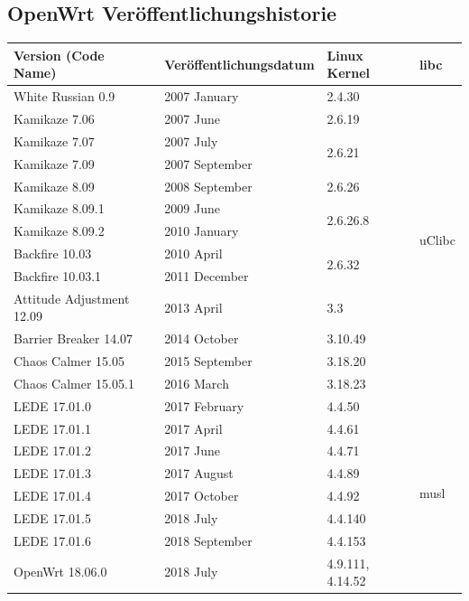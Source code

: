 \documentclass[a4paper]{book}
\begin{document}
\begin{large}
\begin{appendix}
\chapter{OpenWrt Veröffentlichungshistorie}
\begin{table}[ht]
\centering
\def\arraystretch{1}
\begin{tabular}{llll}
\hline
\textbf{Version (Code Name)} & \textbf{Veröffentlichungsdatum} & \textbf{Linux Kernel} & \textbf{libc} \\ \hline
White Russian 0.9 & 2007 January & 2.4.30 & \multirow{13}{*}{uClibc} \\ \cline{1-3}
Kamikaze 7.06 & 2007 June & 2.6.19 &  \\ \cline{1-3}
Kamikaze 7.07 & 2007 July & \multirow{2}{*}{2.6.21} &  \\ \cline{1-2}
Kamikaze 7.09 & 2007 September &  &  \\ \cline{1-3}
Kamikaze 8.09 & 2008 September & 2.6.26 &  \\ \cline{1-3}
Kamikaze 8.09.1 & 2009 June & \multirow{2}{*}{2.6.26.8} &  \\ \cline{1-2}
Kamikaze 8.09.2 & 2010 January &  &  \\ \cline{1-3}
Backfire 10.03 & 2010 April & \multirow{2}{*}{2.6.32} &  \\ \cline{1-2}
Backfire 10.03.1 & 2011 December &  &  \\ \cline{1-3}
Attitude Adjustment 12.09 & 2013 April & 3.3 &  \\ \cline{1-3}
Barrier Breaker 14.07 & 2014 October & 3.10.49 &  \\ \cline{1-3}
Chaos Calmer 15.05 & 2015 September & 3.18.20 &  \\ \cline{1-3}
Chaos Calmer 15.05.1 & 2016 March & 3.18.23 &  \\ \hline
LEDE 17.01.0 & 2017 February & 4.4.50 & \multirow{21}{*}{musl} \\ \cline{1-3}
LEDE 17.01.1 & 2017 April & 4.4.61 &  \\ \cline{1-3}
LEDE 17.01.2 & 2017 June & 4.4.71 &  \\ \cline{1-3}
LEDE 17.01.3 & 2017 August & 4.4.89 &  \\ \cline{1-3}
LEDE 17.01.4 & 2017 October & 4.4.92 &  \\ \cline{1-3}
LEDE 17.01.5 & 2018 July & 4.4.140 &  \\ \cline{1-3}
LEDE 17.01.6 & 2018 September & 4.4.153 &  \\ \cline{1-3}
OpenWrt 18.06.0 & 2018 July & 4.9.111, 4.14.52 &  \\ \cline{1-3}

\end{tabular}
\end{table}
\end{appendix}
\end{large}
\end{document}
